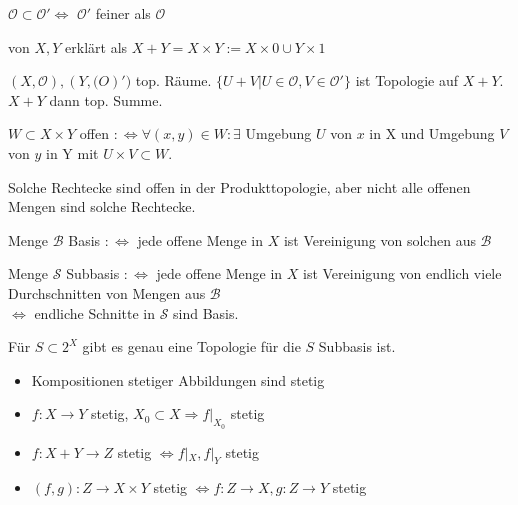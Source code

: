 \begin{defi}
  $\mathcal{O} \subset \mathcal{O}' \Leftrightarrow$
  $\mathcal{O}'$ feiner als $\mathcal{O}$
\end{defi}

\begin{defi}
  von $X, Y$ erklärt als
  $X+Y = X\times Y:= X\times {0} \cup Y\times {1}$
\end{defi}

\begin{defi}
  $(X,\mathcal{O}), (Y,\mathcal(O)')$ top. Räume.
  $\{U+V | U \in \mathcal{O}, V \in \mathcal{O}'\}$
  ist Topologie auf $X+Y$. $X+Y$ dann top. Summe.
\end{defi}

\begin{defi}[Produkttopologie]
  $W \subset X\times Y$ offen
  $:\Leftrightarrow \forall (x,y) \in W: \exists$
  Umgebung $U$ von $x$ in X und Umgebung $V$ von $y$ in Y
  mit $U \times V \subset W$.
\end{defi}

\begin{bem}
  Solche \glqq Rechtecke\grqq{} sind offen in der Produkttopologie,
  aber nicht alle offenen Mengen sind solche Rechtecke.
\end{bem}

\begin{defi}[Basis]
  Menge $\mathcal{B}$ Basis $:\Leftrightarrow$ jede offene Menge
  in $X$ ist Vereinigung von solchen aus $\mathcal{B}$
\end{defi}

\begin{defi}[Subbasis]
  Menge $\mathcal{S}$ Subbasis $:\Leftrightarrow$ jede offene Menge
  in $X$ ist Vereinigung von endlich viele Durchschnitten
  von Mengen aus $\mathcal{B}$\\
  $\Leftrightarrow$ endliche Schnitte in $\mathcal{S}$ sind Basis.
\end{defi}

\begin{bem}
  Für $S \subset 2^X$ gibt es genau eine Topologie für die $S$ Subbasis ist.
\end{bem}

\begin{bem}
  \begin{itemize}
    \item Kompositionen stetiger Abbildungen sind stetig
    \item $f:X\to Y$ stetig, $X_0 \subset X \Rightarrow f|_{X_0}$ stetig
    \item $f:X+Y\to Z$ stetig $\Leftrightarrow f|_X, f|_Y$ stetig
    \item $(f,g): Z\to X\times Y$ stetig $\Leftrightarrow f:Z\to X, g:Z\to Y$ stetig
  \end{itemize}
\end{bem}


